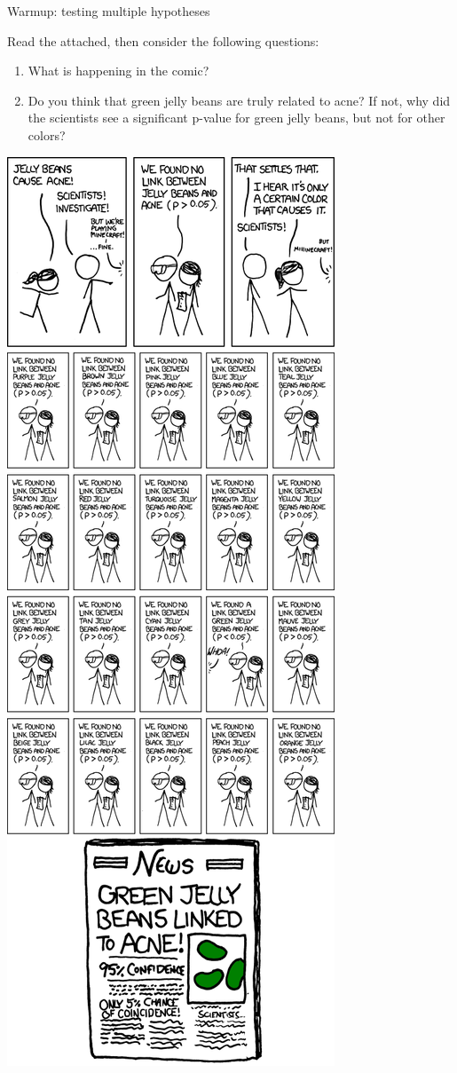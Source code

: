 \documentclass[11pt]{article}
\begin{document}
\begin{center}
\Large
Warmup: testing multiple hypotheses \\
\normalsize
\vspace{5mm}
\end{center}

Read the attached, then consider the following questions:

\begin{enumerate}
\item What is happening in the comic? 

\vspace{3cm}

\item Do you think that green jelly beans are truly related to acne? If not, why did the scientists see a significant p-value for green jelly beans, but not for other colors?
\end{enumerate}

\newpage

\vspace{-2cm}

\begin{center}
\includegraphics[scale=0.55]{significant.png}
\end{center}
\end{document}
